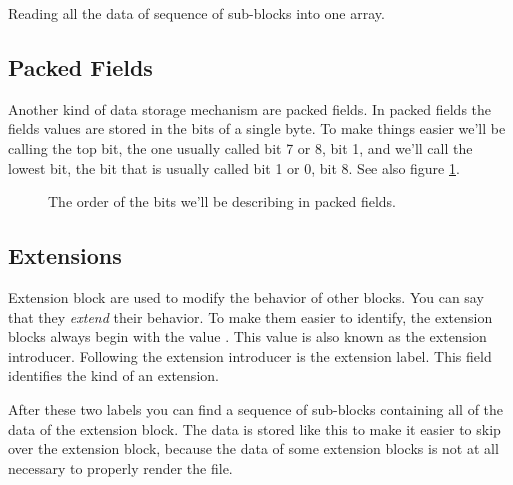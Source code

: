 \begin{refsection}
  \begin{algorithm}[H]
    \caption{Reading all the data of sequence of sub-blocks into one array.}
    \label{alg:gif-sub-blocks}
    \begin{algorithmic}[1]
      \Repeat
      \EndRepeatn


    \end{algorithmic}
  \end{algorithm}

  \subsection{Packed Fields}

  Another kind of data storage mechanism are packed fields. In packed
  fields the fields values are stored in the bits of a single byte. To
  make things easier we'll be calling the top bit, the one usually
  called bit 7 or 8, bit 1, and we'll call the lowest bit, the bit
  that is usually called bit 1 or 0, bit 8. See also figure
  \ref{fig:gif-packed-fields}.

  \begin{figure}
    \centering
    \caption{The order of the bits we'll be describing in packed fields.}
    \label{fig:gif-packed-fields}
  \end{figure}

  \subsection{Extensions}

  Extension block are used to modify the behavior of other blocks. You
  can say that they \textit{extend} their behavior. To make them
  easier to identify, the extension blocks always begin with the value
  . This value is also known as the extension
  introducer. Following the extension introducer is the extension
  label. This field identifies the kind of an extension.

  After these two labels you can find a sequence of sub-blocks
  containing all of the data of the extension block. The data is
  stored like this to make it easier to skip over the extension block,
  because the data of some extension blocks is not at all necessary to
  properly render the file.


\end{refsection}

